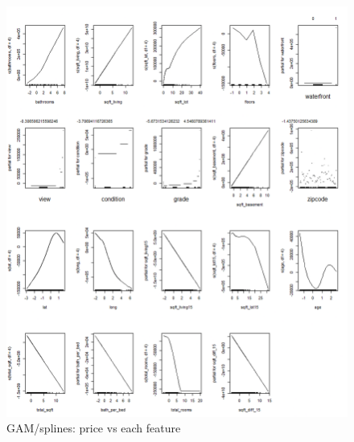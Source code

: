 \documentclass[a4paper, 11pt]{article}
\begin{document}
\begin{figure}[H]
\includegraphics[scale=0.4]{gam}
\centering
\caption{GAM/splines: price vs each feature}
\label{fig:gam}
\end{figure}
\end{document}
